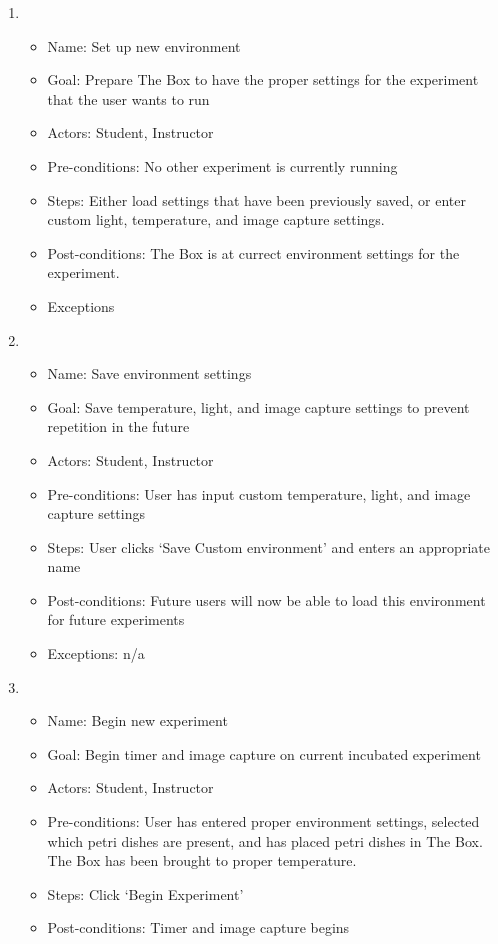 \begin{enumerate}
	\item 
	\begin{itemize}
		\item Name: Set up new environment
		\item Goal: Prepare The Box to have the proper settings for the experiment that the user wants to run
		\item Actors: Student, Instructor
		\item Pre-conditions: No other experiment is currently running
		\item Steps: Either load settings that have been previously saved, or enter custom light, temperature, and image capture settings. 
		\item Post-conditions: The Box is at currect environment settings for the experiment.
		\item Exceptions
	\end{itemize}
	\item 
	\begin{itemize}
		\item Name: Save environment settings
		\item Goal: Save temperature, light, and image capture settings to prevent repetition in the future
		\item Actors: Student, Instructor
		\item Pre-conditions: User has input custom temperature, light, and image capture settings
		\item Steps: User clicks `Save Custom environment' and enters an appropriate name
		\item Post-conditions: Future users will now be able to load this environment for future experiments
		\item Exceptions: n/a
	\end{itemize}
	\item 
	\begin{itemize}
		\item Name: Begin new experiment
		\item Goal: Begin timer and image capture on current incubated experiment
		\item Actors:  Student, Instructor
		\item Pre-conditions: User has entered proper environment settings, selected which petri dishes are present, and has placed petri dishes in The Box. The Box has been brought to proper temperature.
		\item Steps: Click `Begin Experiment'
		\item Post-conditions: Timer and image capture begins

\end{itemize}
\end{enumerate}
